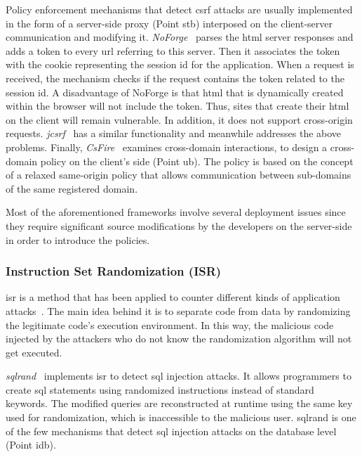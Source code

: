 \documentclass[conference]{IEEEtran}
\begin{document}
Policy enforcement mechanisms that detect {\sc csrf}
attacks are usually implemented in the form of a
server-side proxy (Point {\sc s}t{\sc b})
interposed on the client-server communication and modifying
it. {\it NoForge}~\cite{JKK06a}
parses the {\sc html} server responses
and adds a token to every {\sc url} referring to this
server. Then it associates the token with the cookie
representing the session {\sc id} for the application.
When a request is received, the mechanism checks
if the request contains the token related
to the session {\sc id}. A disadvantage of NoForge
is that {\sc html} that is dynamically created within
the browser will not include the token.
Thus, sites that create their {\sc html} on the client
will remain vulnerable. In addition, it does not
support cross-origin requests.
{\it j{\sc csrf}}~\cite{PS11} has a similar
functionality and meanwhile addresses the above problems.
Finally, {\it CsFire}~\cite{DDHPJ10}
examines cross-domain interactions, to design a
cross-domain policy on the client's side (Point {\sc ub}).
The policy is based on the concept of a relaxed
same-origin policy that allows communication between
sub-domains of the same registered domain.

Most of the aforementioned frameworks involve
several deployment issues since they
require significant source modifications by the
developers on the server-side in order to
introduce the policies.

\subsubsection{Instruction Set Randomization (ISR)}

{\sc isr} is a method that has been applied to counter different kinds
of application attacks~\cite{K09b,KKP03}. The main idea behind it is
to separate code from data by randomizing the legitimate code's
execution environment. In this way, the malicious code injected by the
attackers who do not know the randomization algorithm will not get
executed.

{\it {\sc sql}rand}~\cite{BK04} implements {\sc isr} to detect {\sc
  sql} injection attacks. It allows programmers to create {\sc sql}
statements using randomized instructions instead of standard keywords.
The modified queries are reconstructed at runtime using the same key
used for randomization, which is inaccessible to the malicious user.
{\sc sql}rand is one of the few mechanisms that detect {\sc sql}
injection attacks on the database level (Point i{\sc db}).
\end{document}
